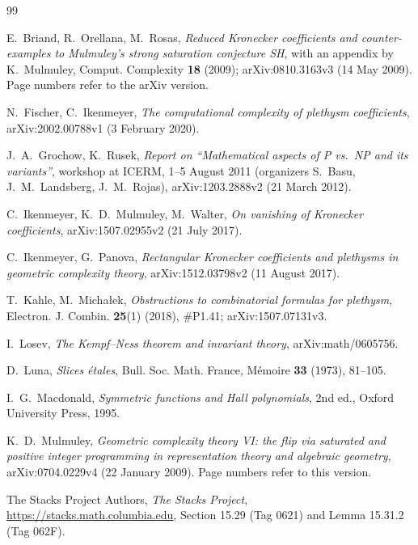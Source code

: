 \begin{thebibliography}{99}

E.~Briand, R.~Orellana, M.~Rosas, \emph{Reduced Kronecker coefficients and
counter-examples to Mulmuley's strong saturation conjecture SH}, with an
appendix by K.~Mulmuley, Comput. Complexity \textbf{18} (2009);
arXiv:0810.3163v3 (14 May 2009). Page numbers refer to the arXiv version.

N.~Fischer, C.~Ikenmeyer, \emph{The computational complexity of plethysm
coefficients}, arXiv:2002.00788v1 (3 February 2020).

J.~A.~Grochow, K.~Rusek, \emph{Report on ``Mathematical aspects of P vs.\ NP
and its variants''}, workshop at ICERM, 1--5 August 2011 (organizers S.~Basu,
J.~M.~Landsberg, J.~M.~Rojas), arXiv:1203.2888v2 (21 March 2012).

C.~Ikenmeyer, K.~D.~Mulmuley, M.~Walter, \emph{On vanishing of Kronecker
coefficients}, arXiv:1507.02955v2 (21 July 2017).

C.~Ikenmeyer, G.~Panova, \emph{Rectangular Kronecker coefficients and
plethysms in geometric complexity theory}, arXiv:1512.03798v2 (11 August 2017).

T.~Kahle, M.~Micha\l{}ek, \emph{Obstructions to combinatorial formulas for
plethysm}, Electron. J. Combin. \textbf{25}(1) (2018), \#P1.41;
arXiv:1507.07131v3.

I.~Losev, \emph{The Kempf--Ness theorem and invariant theory},
arXiv:math/0605756.

D.~Luna, \emph{Slices \'etales}, Bull. Soc. Math. France, M\'emoire \textbf{33}
(1973), 81--105.

I.~G.~Macdonald, \emph{Symmetric functions and Hall polynomials}, 2nd ed.,
Oxford University Press, 1995.

K.~D.~Mulmuley, \emph{Geometric complexity theory VI: the flip via saturated
and positive integer programming in representation theory and algebraic
geometry}, arXiv:0704.0229v4 (22 January 2009). Page numbers refer to this
version.

The Stacks Project Authors, \emph{The Stacks Project},
\url{https://stacks.math.columbia.edu}, Section 15.29 (Tag 0621) and
Lemma 15.31.2 (Tag 062F).

\end{thebibliography}


